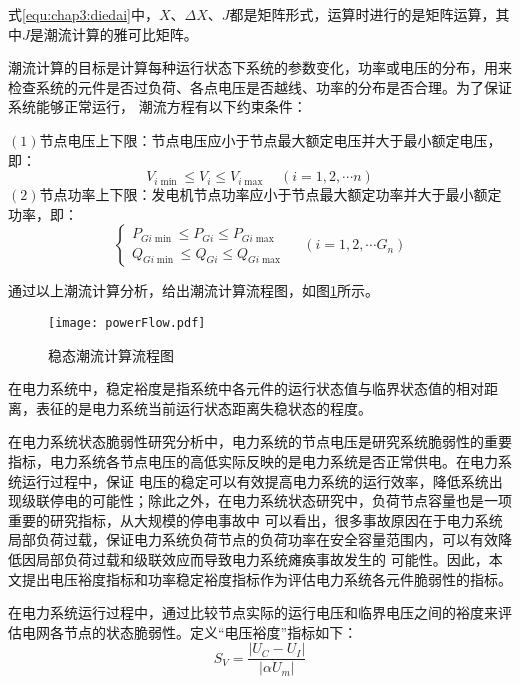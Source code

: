式\ref{equ:chap3:diedai}中，$X$、$\Delta X$、$J$都是矩阵形式，运算时进行的是矩阵运算，其中$J$是潮流计算的雅可比矩阵。

潮流计算的目标是计算每种运行状态下系统的参数变化，功率或电压的分布，用来检查系统的元件是否过负荷、各点电压是否越线、功率的分布是否合理。为了保证系统能够正常运行，
潮流方程有以下约束条件：

$(1)$节点电压上下限：节点电压应小于节点最大额定电压并大于最小额定电压，即：
\begin{equation}
  V_{i \min } \leq V_{i} \leq V_{i \max } \quad(i=1,2, \cdots n)
  \end{equation}
$(2)$节点功率上下限：发电机节点功率应小于节点最大额定功率并大于最小额定功率，即：
\begin{equation}
\left\{\begin{array}{l}{P_{G i \min } \leq P_{G i} \leq P_{G i \max }} \\ {Q_{G i \min } \leq Q_{G i} \leq Q_{G i \max }}\end{array} \quad\left(i=1,2, \cdots G_{n}\right)\right.
\end{equation}

通过以上潮流计算分析，给出潮流计算流程图，如图\ref{fig:powerFlow}所示。
\begin{figure}[H] %
  \centering
  \texttt{[image: powerFlow.pdf]}
  \caption{稳态潮流计算流程图}
  \label{fig:powerFlow}
\end{figure}


在电力系统中，稳定裕度是指系统中各元件的运行状态值与临界状态值的相对距离，表征的是电力系统当前运行状态距离失稳状态的程度。

在电力系统状态脆弱性研究分析中，电力系统的节点电压是研究系统脆弱性的重要指标，电力系统各节点电压的高低实际反映的是电力系统是否正常供电。在电力系统运行过程中，保证
电压的稳定可以有效提高电力系统的运行效率，降低系统出现级联停电的可能性；除此之外，在电力系统状态研究中，负荷节点容量也是一项重要的研究指标，从大规模的停电事故中
可以看出，很多事故原因在于电力系统局部负荷过载，保证电力系统负荷节点的负荷功率在安全容量范围内，可以有效降低因局部负荷过载和级联效应而导致电力系统瘫痪事故发生的
可能性。因此，本文提出电压裕度指标和功率稳定裕度指标作为评估电力系统各元件脆弱性的指标。

在电力系统运行过程中，通过比较节点实际的运行电压和临界电压之间的裕度来评估电网各节点的状态脆弱性。定义“电压裕度”指标如下：
\begin{equation}
  S_V=\frac{\left|U_{C}-U_{I}\right|}{\left|\alpha U_{m}\right|}
  \end{equation}

